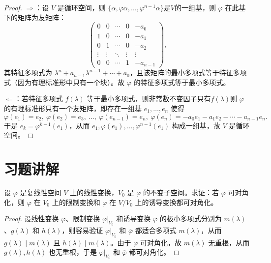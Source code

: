 \documentclass[lang=cn,12pt]{elegantbook}
\begin{document}
\begin{proof}
    \(\Rightarrow\)：设 \(V\) 是循环空间，则 \( \{\alpha,\varphi\alpha,\dots,\varphi^{n-1}\alpha\}\)是$V$的一组基，则 \(\varphi\) 在此基下的矩阵为友矩阵：
    \[
    \begin{pmatrix}
    0 & 0 & \cdots & 0 & -a_0 \\
    1 & 0 & \cdots & 0 & -a_1 \\
    0 & 1 & \cdots & 0 & -a_2 \\
    \vdots & \vdots & \ddots & \vdots & \vdots \\
    0 & 0 & \cdots & 1 & -a_{n-1}
    \end{pmatrix},
    \]
    其特征多项式为 \(\lambda^n + a_{n-1}\lambda^{n-1}+\cdots+a_0\)，且该矩阵的最小多项式等于特征多项式（因为有理标准形中只有一个块）。故 \(\varphi\) 的特征多项式等于最小多项式。
    
    \(\Leftarrow\)：若特征多项式 \(f(\lambda)\) 等于最小多项式，则非常数不变因子只有$f(\lambda)$则 \(\varphi\) 的有理标准形只有一个友矩阵，即存在一组基 \(e_1,\dots,e_n\) 使得
    \[
    \varphi(e_1)=e_2,\ \varphi(e_2)=e_3,\ \dots,\ \varphi(e_{n-1})=e_n,\ \varphi(e_n)=-a_0e_1-a_1e_2-\cdots-a_{n-1}e_n.
    \]
    于是 \(e_k = \varphi^{k-1}(e_1)\)，从而 \(e_1,\varphi(e_1),\dots,\varphi^{n-1}(e_1)\) 构成一组基，故 \(V\) 是循环空间。
\end{proof}

\section{习题讲解}

\begin{example}
设 \(\varphi\) 是复线性空间 \(V\) 上的线性变换，\(V_0\) 是 \(\varphi\) 的不变子空间。求证：若 \(\varphi\) 可对角化，则 \(\varphi\) 在 \(V_0\) 上的限制变换和 \(\varphi\) 在 \(V/V_0\) 上的诱导变换都可对角化。
\end{example}

\begin{proof}
设线性变换 \(\varphi\)、限制变换 \(\varphi|_{V_0}\) 和诱导变换 \(\overline{\varphi}\) 的极小多项式分别为 \(m(\lambda)\)、\(g(\lambda)\) 和 \(h(\lambda)\)，则容易验证 \(\varphi|_{V_0}\) 和 \(\overline{\varphi}\) 都适合多项式 \(m(\lambda)\)，从而 \(g(\lambda) \mid m(\lambda)\) 且 \(h(\lambda) \mid m(\lambda)\)。由于 \(\varphi\) 可对角化，故 \(m(\lambda)\) 无重根，从而 \(g(\lambda), h(\lambda)\) 也无重根，于是 \(\varphi|_{V_0}\) 和 \(\overline{\varphi}\) 都可对角化。
\end{proof}
\end{document}
